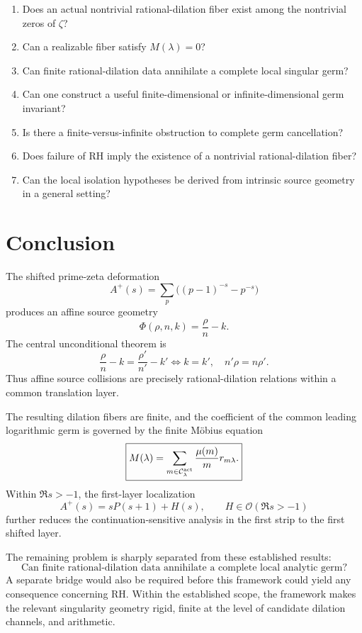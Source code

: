 \documentclass[11pt]{article}
\theoremstyle{definition}
\newcommand{\C}{\mathcal C}
\newcommand{\PhiA}{\Phi}
\newcommand{\Ocal}{\mathcal O}
\begin{document}
\begin{enumerate}
\item Does an actual nontrivial rational-dilation fiber exist among the nontrivial zeros of $\zeta$?
\item Can a realizable fiber satisfy $M(\lambda)=0$?
\item Can finite rational-dilation data annihilate a complete local singular germ?
\item Can one construct a useful finite-dimensional or infinite-dimensional germ invariant?
\item Is there a finite-versus-infinite obstruction to complete germ cancellation?
\item Does failure of RH imply the existence of a nontrivial rational-dilation fiber?
\item Can the local isolation hypotheses be derived from intrinsic source geometry in a general setting?
\end{enumerate}

\section{Conclusion}

The shifted prime-zeta deformation
\[
A^+(s)=\sum_p\bigl((p-1)^{-s}-p^{-s}\bigr)
\]
produces an affine source geometry
\[
\PhiA(\rho,n,k)=\frac{\rho}{n}-k.
\]
The central unconditional theorem is
\[
\boxed{
\frac{\rho}{n}-k
=
\frac{\rho'}{n'}-k'
\iff
k=k',\quad
n'\rho=n\rho'.
}
\]
Thus affine source collisions are precisely rational-dilation relations within a common translation layer.

The resulting dilation fibers are finite, and the coefficient of the common leading logarithmic germ is governed by the finite Möbius equation\[
\boxed{
M(\lambda)=
\sum_{m\in\C_\lambda^{\rm act}}\frac{\mu(m)}m r_{m\lambda}.
}
\]
Within $\Re s>-1$, the first-layer localization
\[
\boxed{
A^+(s)=sP(s+1)+H(s),
\qquad H\in\Ocal(\Re s>-1)
}
\]
further reduces the continuation-sensitive analysis in the first strip to the first shifted layer.

The remaining problem is sharply separated from these established results:
\[
\boxed{
\text{Can finite rational-dilation data annihilate a complete local analytic germ?}
}
\]
A separate bridge would also be required before this framework could yield any consequence concerning RH. Within the established scope, the framework makes the relevant singularity geometry rigid, finite at the level of candidate dilation channels, and arithmetic.
\end{document}
